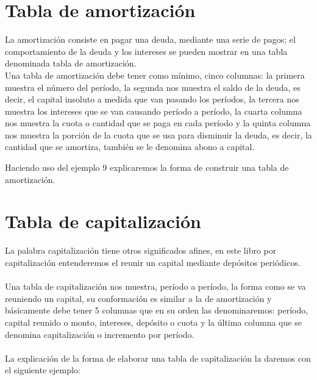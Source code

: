 	\section{Tabla de amortización}
	La amortización consiste en pagar una deuda, mediante una serie de pagos; el comportamiento de la deuda y los intereses se pueden mostrar en una tabla denominada tabla de amortización.\\
	Una tabla de amortización debe tener como mínimo, cinco columnas: la primera muestra el número del período, la segunda nos muestra el saldo de la deuda, es decir, el capital insoluto a medida que van pasando los períodos, la tercera nos muestra los intereses que se van causando período a período, la cuarta columna nos muestra la cuota o cantidad que se paga en cada período y la quinta columna nos muestra la porción de la cuota que se usa para disminuir la deuda, es decir, la cantidad que se amortiza, también se le denomina abono a capital.
	\vspace{1mm}

	Haciendo uso del ejemplo 9 explicaremos la forma de construir una tabla de amortización.\\

	

	\section{Tabla de capitalización}
	La palabra capitalización tiene otros significados afines, en este libro por capitalización entenderemos el reunir un capital mediante depósitos periódicos.
	\\\\
	Una tabla de capitalización nos muestra, período a período, la forma como se va reuniendo un capital, su conformación es similar a la de amortización y básicamente debe tener 5 columnas que en su orden las denominaremos: período, capital reunido o monto, intereses, depósito o cuota y la última columna que se denomina capitalización o incremento por período.
	\\\\
	La explicación de la forma de elaborar una tabla de capitalización la daremos con el siguiente ejemplo:
	\\\\

	


\clearpage
